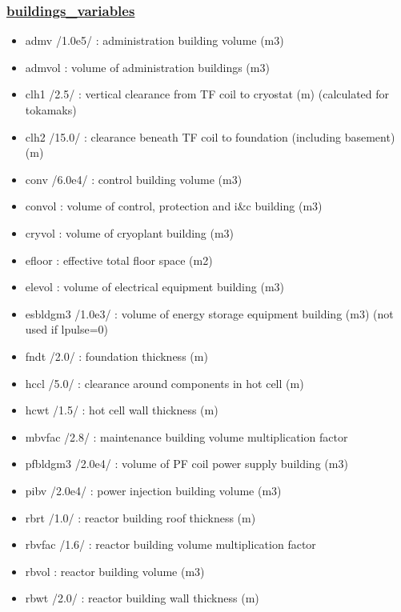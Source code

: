 \documentclass[
]{article}
\providecommand{\tightlist}{%
  \setlength{\itemsep}{0pt}\setlength{\parskip}{0pt}}
\begin{document}
\begin{itemize}
  \hypertarget{buildings_variables}{%
  \subsubsection{\texorpdfstring{\href{buildings_variables.html}{buildings\_variables}}{buildings\_variables}}\label{buildings_variables}}

  \begin{itemize}
  \tightlist
  \item
    admv /1.0e5/ : administration building volume (m3)
  \item
    admvol : volume of administration buildings (m3)
  \item
    clh1 /2.5/ : vertical clearance from TF coil to cryostat (m)
    (calculated for tokamaks)
  \item
    clh2 /15.0/ : clearance beneath TF coil to foundation (including
    basement) (m)
  \item
    conv /6.0e4/ : control building volume (m3)
  \item
    convol : volume of control, protection and i\&c building (m3)
  \item
    cryvol : volume of cryoplant building (m3)
  \item
    efloor : effective total floor space (m2)
  \item
    elevol : volume of electrical equipment building (m3)
  \item
    esbldgm3 /1.0e3/ : volume of energy storage equipment building (m3)
    (not used if lpulse=0)
  \item
    fndt /2.0/ : foundation thickness (m)
  \item
    hccl /5.0/ : clearance around components in hot cell (m)
  \item
    hcwt /1.5/ : hot cell wall thickness (m)
  \item
    mbvfac /2.8/ : maintenance building volume multiplication factor
  \item
    pfbldgm3 /2.0e4/ : volume of PF coil power supply building (m3)
  \item
    pibv /2.0e4/ : power injection building volume (m3)
  \item
    rbrt /1.0/ : reactor building roof thickness (m)
  \item
    rbvfac /1.6/ : reactor building volume multiplication factor
  \item
    rbvol : reactor building volume (m3)
  \item
    rbwt /2.0/ : reactor building wall thickness (m)

\end{itemize}
\end{itemize}
\end{document}
